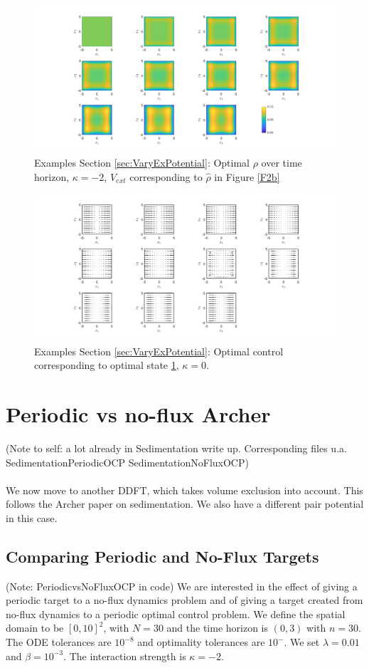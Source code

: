 \documentclass[11pt, a4paper]{article}
\theoremstyle{definition}
\newcommand{\hr}{\widehat \rho}
\begin{document}
\begin{figure}[h]
	\centering
	\includegraphics[scale=0.35]{rhoOptknV.png}
	\caption{Examples Section \ref{sec:VaryExPotential}: Optimal $\rho$ over time horizon, $\kappa = -2$, $V_{ext}$ corresponding to $\hr$ in Figure \ref{F2b}} 
	\label{F3e}
\end{figure}
\begin{figure}[h]
	\centering
	\includegraphics[scale=0.35]{ConOptknV.png}
	\caption{Examples Section \ref{sec:VaryExPotential}: Optimal control corresponding to optimal state \ref{F3e}, $\kappa = 0$.} 
	\label{F3f}
\end{figure}



\section{Periodic vs no-flux Archer}
(Note to self: a lot already in Sedimentation write up. Corresponding files u.a. SedimentationPeriodicOCP
SedimentationNoFluxOCP)\\
\\
We now move to another DDFT, which takes volume exclusion into account. This follows the Archer paper on sedimentation. We also have a different pair potential in this case.
\subsection{Comparing Periodic and No-Flux Targets} \label{sec:PeriodicNoFlux1}
(Note: PeriodicvsNoFluxOCP in code)
We are interested in the effect of giving a periodic target to a no-flux dynamics problem and of giving a target created from no-flux dynamics to a periodic optimal control problem. We define the spatial domain to be $[0,10]^2$, with $N = 30$ and the time horizon is $(0,3)$ with $n = 30$. The ODE tolerances are $10^{-8}$ and optimality tolerances are $10^{-}$. We set $\lambda = 0.01$ and $\beta = 10^{-3}$. The interaction strength is $\kappa  = -2$.
\end{document}
